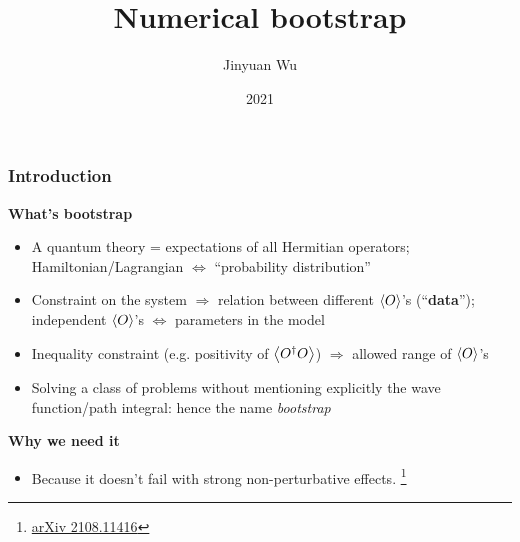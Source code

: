 \documentclass{beamer}
\title{Numerical bootstrap}
\author{Jinyuan Wu}
\institute{Department of Physics, Fudan University}
\date{2021}
\newcommand{\concept}[1]{\textbf{#1}}
\begin{document}
\frame{\titlepage}

\begin{frame}
\frametitle{Introduction}

\textbf{What's bootstrap}

\begin{itemize}
    \item A quantum theory = expectations of all Hermitian operators; 
    Hamiltonian/Lagrangian $\Leftrightarrow$ ``probability distribution''
    \item Constraint on the system $\Rightarrow$ relation between different $\expval{O}$'s (``\concept{data}'');
    independent $\expval{O}$'s $\Leftrightarrow$ parameters in the model
    \item Inequality constraint (e.g. positivity of $\expval{O^\dagger O}$) $\Rightarrow$ allowed 
    range of $\expval{O}$'s
    \item Solving a class of problems without mentioning explicitly the wave function/path integral: 
    hence the name \emph{bootstrap}
\end{itemize}

\vspace{1em}

\textbf{Why we need it}

\begin{itemize}
    \item Because it doesn't fail with strong non-perturbative effects. \footnote{\href{https://arxiv.org/abs/2108.11416}{arXiv 2108.11416}}
\end{itemize}

\end{frame}
\end{document}
